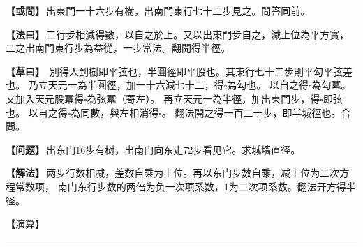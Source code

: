 \documentclass[11pt,a4paper]{article}
\let\origsquare\square
\renewcommand{\square}{\ensuremath{\origsquare}}%
\newcommand{\longline}{\noindent\rule{\textwidth}{0.4pt}}
\newcommand{\clOWEN}[1]{%
  \par\vspace{0.3em}%
  \noindent\textcolor{problemcolor}{\textbf{【或問】}}\,{\tradfont #1}\par\nopagebreak%
}
\newcommand{\mdOWEN}[1]{%
  \par\vspace{0.3em}%
  \noindent\textcolor{problemcolor}{\textbf{【问题】}}\,{\modfont #1}\par\nopagebreak%
}
\newcommand{\clFAYUE}[1]{%
  \par\noindent\textcolor{methodcolor}{\textbf{【法曰】}}\,{\tradfont #1}\par\nopagebreak%
}
\newcommand{\mdFAYUE}[1]{%
  \par\noindent\textcolor{methodcolor}{\textbf{【解法】}}\,{\modfont #1}\par\nopagebreak%
}
\newcommand{\clTSAOYUE}[1]{%
  \par\noindent\textcolor{workcolor}{\textbf{【草曰】}}\,{\tradfont #1}\par%
}
\newcommand{\mdTSAOYUE}[1]{%
  \par\noindent\textcolor{workcolor}{\textbf【演算】}}\,{\modfont #1}\par%
\begin{document}
\begin{paracol}{2}

\begin{leftcolumn}
\clOWEN{出東門一十六步有樹，出南門東行七十二步見之。問答同前。}

\clFAYUE{二行步相減得數，以自之於上。又以出東門步自之，減上位為平方實，
二之出南門東行步為益從，一步常法。翻開得半徑。}

\clTSAOYUE{%
別得人到樹即平弦也，半圓徑即平股也。其東行七十二步則平勾平弦差也。
乃立天元一為半圓徑，加一十六減七十二，得$\square$為勾也。
以自之得$\square$為勾冪。又加入天元股冪得$\square$為弦冪（寄左）。
再立天元一為半徑，加出東門步，得$\square$即弦也。
以自之得$\square$為同數，與左相消得$\square$。
翻法開之得一百二十步，即半城徑也。合問。}
\end{leftcolumn}

\switchcolumn

\begin{rightcolumn}
\mdOWEN{出东门16步有树，出南门向东走72步看见它。求城墙直径。}

\mdFAYUE{两步行数相减，差数自乘为上位。再以东门步数自乘，减上位为二次方程常数项，
南门东行步数的两倍为负一次项系数，1为二次项系数。翻法开方得半径。}

\mdTSAOYUE{%
辨识得：人到达树处即为平弦，半圆径即为平股。东行72步为平勾与平弦之差。
设天元一为半圆径，加上16减去72，得$\square$为勾。
自乘得$\square$为勾冪。加上天元的平方（股冪）得$\square$为弦冪（寄左）。
再设天元一为半径，加出东门步数，得$\square$即弦。
自乘得$\square$为同数，与左式相消得$\square$。
翻法开方得120步，即半城径。符合所问。}
\end{rightcolumn}

\end{paracol}

\vspace{0.3cm}
\begin{center}\longline\end{center}
\end{document}
